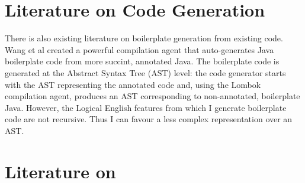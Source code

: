 \documentclass[../main.tex]{subfiles}
\begin{document}
\section{Literature on Code Generation}
There is also existing literature on boilerplate generation from existing code. Wang et al \cite[]{classless_java} created a powerful compilation agent that auto-generates Java boilerplate code from more succint, annotated Java. The boilerplate code is generated at the Abstract Syntax Tree (AST) level: the code generator starts with the AST representing the annotated code and, using the Lombok compilation agent, produces an AST corresponding to non-annotated, boilerplate Java. However, the Logical English features from which I generate boilerplate code are not recursive. Thus I can favour a less complex representation over an AST.

\section{Literature on }
\end{document}
